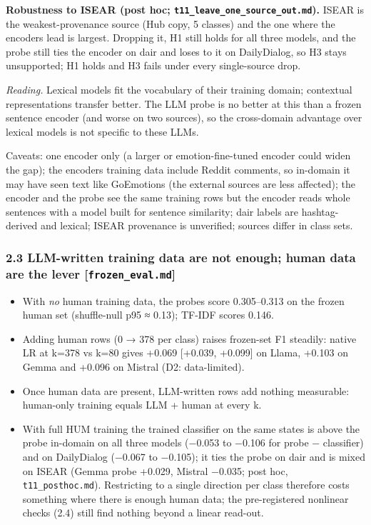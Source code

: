 \documentclass[
  10pt,
]{article}
\providecommand{\tightlist}{%
  \setlength{\itemsep}{0pt}\setlength{\parskip}{0pt}}
\begin{document}
\textbf{Robustness to ISEAR (post hoc;
\texttt{t11\_leave\_one\_source\_out.md}).} ISEAR is the
weakest-provenance source (Hub copy, 5 classes) and the one where the
encoder\textquotesingle s lead is largest. Dropping it, H1 still holds
for all three models, and the probe still ties the encoder on dair and
loses to it on DailyDialog, so H3 stays unsupported; H1 holds and H3
fails under every single-source drop.

\emph{Reading.} Lexical models fit the vocabulary of their training
domain; contextual representations transfer better. The LLM probe is no
better at this than a frozen sentence encoder (and worse on two
sources), so the cross-domain advantage over lexical models is not
specific to these LLMs.

Caveats: one encoder only (a larger or emotion-fine-tuned encoder could
widen the gap); the encoder\textquotesingle s training data include
Reddit comments, so in-domain it may have seen text like GoEmotions (the
external sources are less affected); the encoder and the probe see the
same training rows but the encoder reads whole sentences with a model
built for sentence similarity; dair labels are hashtag-derived and
lexical; ISEAR provenance is unverified; sources differ in class sets.

\subsubsection{\texorpdfstring{2.3 LLM-written training data are not
enough; human data are the lever
{[}\texttt{frozen\_eval.md}{]}}{2.3 LLM-written training data are not enough; human data are the lever {[}frozen\_eval.md{]}}}\label{23-llm-written-training-data-are-not-enough-human-data-are-the-lever-frozen_evalmd}

\begin{itemize}
\tightlist
\item
  With \emph{no} human training data, the probes score 0.305--0.313 on
  the frozen human set (shuffle-null p95 ≈ 0.13); TF-IDF scores 0.146.
\item
  Adding human rows (0 → 378 per class) raises frozen-set F1 steadily:
  native LR at k=378 vs k=80 gives +0.069 {[}+0.039, +0.099{]} on Llama,
  +0.103 on Gemma and +0.096 on Mistral (D2: data-limited).
\item
  Once human data are present, LLM-written rows add nothing measurable:
  human-only training equals LLM + human at every k.
\item
  With full HUM training the trained classifier on the same states is
  above the probe in-domain on all three models (−0.053 to −0.106 for
  probe − classifier) and on DailyDialog (−0.067 to −0.105); it ties the
  probe on dair and is mixed on ISEAR (Gemma probe +0.029, Mistral
  −0.035; post hoc, \texttt{t11\_posthoc.md}). Restricting to a single
  direction per class therefore costs something where there is enough
  human data; the pre-registered nonlinear checks (2.4) still find
  nothing beyond a linear read-out.
\end{itemize}
\end{document}
